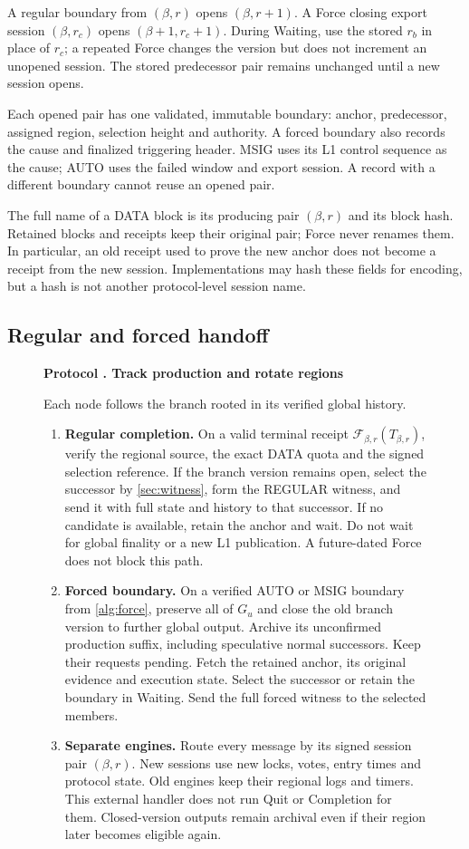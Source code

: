 \documentclass[11pt,a4paper]{article}
\newcommand{\FC}{\mathcal F}
\newcounter{protocol}
\newenvironment{protocol}[3][htbp]{\begin{figure}[#1]\refstepcounter{protocol}\label{#2}
\begin{mdframed}[linewidth=.6pt,skipabove=0pt,skipbelow=0pt,
innertopmargin=7pt,innerbottommargin=7pt]\small
\textbf{Protocol \theprotocol. #3}\par\smallskip}{\end{mdframed}\end{figure}}
\begin{document}
A regular boundary from $(\beta,r)$ opens $(\beta,r+1)$.
A Force closing export session $(\beta,r_c)$ opens
$(\beta+1,r_c+1)$. During Waiting, use the stored $r_b$ in place of
$r_c$; a repeated Force changes the version but does not increment an
unopened session. The stored predecessor pair remains unchanged until
a new session opens.

Each opened pair has one validated, immutable boundary: anchor,
predecessor, assigned region, selection height and authority. A forced
boundary also records the cause and finalized triggering header.
MSIG uses its L1 control sequence as the cause; AUTO uses the failed
window and export session. A record with a different boundary cannot
reuse an opened pair.

The full name of a DATA block is its producing pair $(\beta,r)$ and
its block hash. Retained blocks and receipts keep their original pair;
Force never renames them. In particular, an old receipt used to prove
the new anchor does not become a receipt from the new session.
Implementations may hash these fields for encoding, but a hash is not
another protocol-level session name.

\subsection{Regular and forced handoff}
\begin{protocol}[H]{alg:rotation}{Track production and rotate regions}
Each node follows the branch rooted in its verified global history.
\begin{enumerate}[label=\textbf{\arabic*)},itemsep=3pt]
\item \textbf{Regular completion.} On a valid terminal receipt
$\FC_{\beta,r}(T_{\beta,r})$, verify the regional source, the exact DATA quota and the
signed selection reference. If the branch version remains open, select the
successor by \cref{sec:witness}, form the REGULAR witness, and send it
with full state and history to that successor. If no candidate is
available, retain the anchor and wait. Do not wait for global finality
or a new L1 publication. A future-dated Force does not block this path.

\item \textbf{Forced boundary.} On a verified AUTO or MSIG boundary
from \cref{alg:force}, preserve all of $G_u$ and close the old branch version
to further global output. Archive its unconfirmed production suffix,
including speculative normal successors. Keep their requests pending.
Fetch the retained anchor, its original evidence and execution state.
Select the successor or retain the boundary in Waiting. Send the full
forced witness to the selected members.

\item \textbf{Separate engines.} Route every message by its signed session
pair $(\beta,r)$. New sessions use new locks, votes, entry times and protocol state.
Old engines keep their regional logs and timers. This external handler
does not run Quit or Completion for them. Closed-version outputs remain
archival even if their region later becomes eligible again.
\end{enumerate}
\end{protocol}
\end{document}
